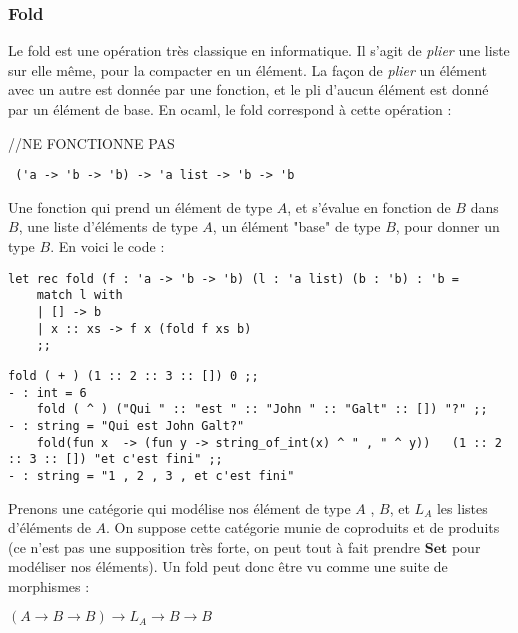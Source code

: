 \documentclass{article}
\begin{document}
\subsubsection{Fold}

Le fold est une opération très classique en informatique. Il s'agit de \textit{plier} une liste sur elle même, pour la compacter en un élément. La façon de \textit{plier} un élément avec un autre est donnée par une fonction, et le pli d'aucun élément est donné par un élément de base. En ocaml, le fold correspond à cette opération :

//NE FONCTIONNE PAS
\begin{verbatim}
 ('a -> 'b -> 'b) -> 'a list -> 'b -> 'b     
\end{verbatim}

Une fonction qui prend un élément de type $A$, et s'évalue en fonction de $B$ dans $B$, une liste d'éléments de type $A$,   un élément "base" de type $B$,  pour donner un type $B$. En voici le code :

\begin{verbatim}
let rec fold (f : 'a -> 'b -> 'b) (l : 'a list) (b : 'b) : 'b = 
    match l with 
    | [] -> b
    | x :: xs -> f x (fold f xs b)
    ;;       
\end{verbatim}


\begin{lstlisting}[languague=OCaml]
    fold ( + ) (1 :: 2 :: 3 :: []) 0 ;; 
- : int = 6 
    fold ( ^ ) ("Qui " :: "est " :: "John " :: "Galt" :: []) "?" ;; 
- : string = "Qui est John Galt?"
    fold(fun x  -> (fun y -> string_of_int(x) ^ " , " ^ y))   (1 :: 2 :: 3 :: []) "et c'est fini" ;; 
- : string = "1 , 2 , 3 , et c'est fini"
\end{lstlisting}

Prenons une catégorie qui modélise nos élément de type $A$ , $B$, et $L_A$ les listes d'éléments de $A$. On suppose cette catégorie munie de coproduits et de produits (ce n'est pas une supposition très forte, on peut tout à fait prendre $\mathbf{Set}$ pour modéliser nos éléments). Un fold peut donc être vu comme une suite de morphismes : 
\begin{center}
$ 
(A \rightarrow B \rightarrow B) \rightarrow L_A \rightarrow B \rightarrow B
$    
\end{center}
\end{document}
